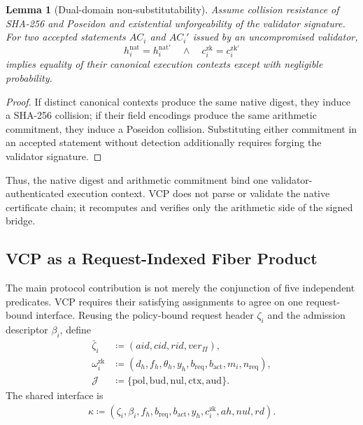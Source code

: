 \documentclass[10pt,journal,compsoc]{IEEEtran}
\newtheorem{lemma}{Lemma}
\begin{document}
\begin{lemma}[Dual-domain non-substitutability]
\label{lem:dual_domain_non_substitution}
Assume collision resistance of SHA-256 and Poseidon and existential unforgeability of the validator signature. For two accepted statements $AC_i$ and $AC_i'$ issued by an uncompromised validator,
\begin{equation}
h_i^{\mathrm{nat}}=h_i^{\mathrm{nat}\prime}
\quad\land\quad
c_i^{\mathrm{zk}}=c_i^{\mathrm{zk}\prime}
\label{eq:dual_domain_equality}
\end{equation}
implies equality of their canonical execution contexts except with negligible probability.
\end{lemma}

\begin{proof}
If distinct canonical contexts produce the same native digest, they induce a SHA-256 collision; if their field encodings produce the same arithmetic commitment, they induce a Poseidon collision. Substituting either commitment in an accepted statement without detection additionally requires forging the validator signature.
\end{proof}

Thus, the native digest and arithmetic commitment bind one validator-authenticated execution context. VCP does not parse or validate the native certificate chain; it recomputes and verifies only the arithmetic side of the signed bridge.
\subsection{VCP as a Request-Indexed Fiber Product}
\label{subsec:vcp_method}

The main protocol contribution is not merely the conjunction of five independent predicates. VCP requires their satisfying assignments to agree on one request-bound interface. Reusing the policy-bound request header $\zeta_i$ and the admission descriptor $\beta_i$, define
\begin{equation}
\begin{aligned}
\bar{\zeta}_i
&\coloneqq(aid,cid,rid,ver_{\Pi}),\\
\omega_i^{\mathrm{zk}}
&\coloneqq
(d_h,f_h,\theta_h,y_h,
b_{\mathrm{req}},b_{\mathrm{act}},m_i,n_{\mathrm{req}}),\\
\mathcal{J}
&\coloneqq
\{\mathrm{pol},\mathrm{bud},\mathrm{nul},\mathrm{ctx},\mathrm{aud}\}.
\end{aligned}
\end{equation}
The shared interface is
\begin{equation}
\begin{aligned}
\kappa\coloneqq
(\zeta_i,\beta_i,f_h,b_{\mathrm{req}},b_{\mathrm{act}},
y_h,c_i^{\mathrm{zk}},ah,nul,rd).
\end{aligned}
\end{equation}
\end{document}
